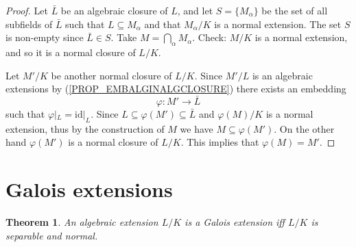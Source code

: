 \documentclass[12pt, letterpaper, oneside]{article}
\theoremstyle{plain}
\newtheorem{theorem}{Theorem}[section]
\theoremstyle{definition}
\newcommand{\id}{\mathrm{id}}
\newcommand{\vs}{\vskip 5mm}
\begin{document}
\vs

\begin{proof}
Let $\bar{L}$ be an algebraic closure of $L$, and let $S = \{M_{\alpha}\}$ be the set of all 
subfields of $\bar{L}$ such that $L \subseteq M_{\alpha}$ and that $M_{\alpha}/K$
is a normal extension. The set $S$ is non-empty since $\bar{L}\in S$. Take 
$M = \bigcap_{\alpha} M_{\alpha}$. Check: $M/K$ is a normal extension, and so it is 
a normal closure of $L/K$.   

Let  $M'/K$ be another  normal closure of $L/K$.  Since $M'/L$ is an  algebraic 
extensions by (\ref{PROP_EMBALGINALGCLOSURE}) there exists an embedding  
$$\varphi\colon M' \to \bar{L}$$
such that $\varphi|_{L}  =  \id|_{L}$. 
Since $L\subseteq \varphi(M')\subseteq \bar{L}$ and $\varphi(M)/K$ is a normal extension, thus
by the construction of $M$ we have $M \subseteq \varphi(M')$. On the other hand $\varphi(M')$
is a normal closure of $L/K$. This implies that $\varphi(M) =  M'$.  

 
 
\end{proof}











\newpage
\section{Galois extensions}
\label{SEC_GALOISEXT}

\begin{theorem}
\label{THM_GALOISSEPNORMAL}
An algebraic extension $L/K$ is a Galois extension iff $L/K$ is separable and normal. 
\end{theorem}



\vs
\end{document}
